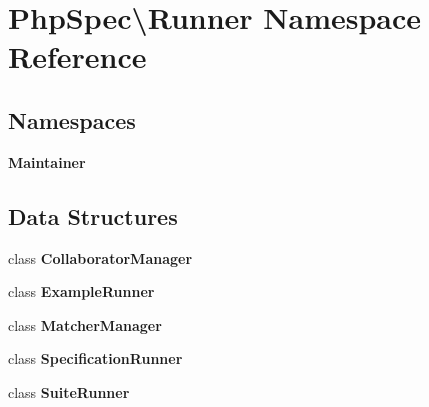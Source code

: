 \section{Php\+Spec\textbackslash{}Runner Namespace Reference}
\label{namespace_php_spec_1_1_runner}
\subsection*{Namespaces}
\begin{DoxyCompactItemize}
\item 
 {\bf Maintainer}
\end{DoxyCompactItemize}
\subsection*{Data Structures}
\begin{DoxyCompactItemize}
\item 
class {\bf Collaborator\+Manager}
\item 
class {\bf Example\+Runner}
\item 
class {\bf Matcher\+Manager}
\item 
class {\bf Specification\+Runner}
\item 
class {\bf Suite\+Runner}
\end{DoxyCompactItemize}
